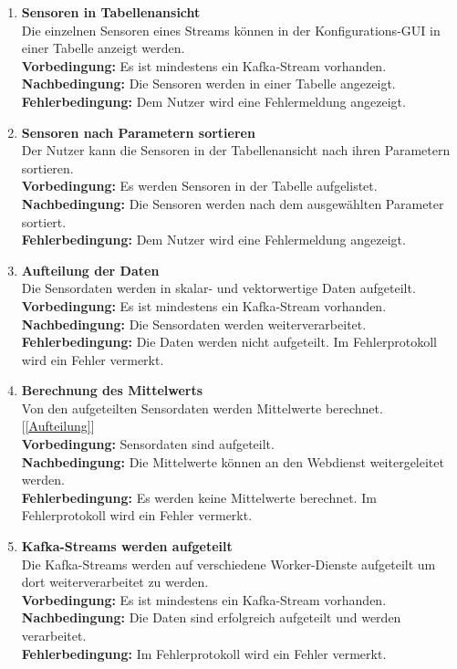\begin{enumerate}[label=\textbf{PF\arabic{enumi}0}]
	\item \textbf{Sensoren in Tabellenansicht}\\
		Die einzelnen Sensoren eines Streams können in der Konfigurations-GUI in einer Tabelle anzeigt werden.\\
		\textbf{Vorbedingung:} Es ist mindestens ein Kafka-Stream vorhanden.\\
		\textbf{Nachbedingung:} Die Sensoren werden in einer Tabelle angezeigt.\\
		\textbf{Fehlerbedingung:} Dem Nutzer wird eine Fehlermeldung angezeigt.
		
	\item \textbf{Sensoren nach Parametern sortieren}\\
		Der Nutzer kann die Sensoren in der Tabellenansicht nach ihren Parametern sortieren.\\
		\textbf{Vorbedingung:} Es werden Sensoren in der Tabelle aufgelistet.\\
		\textbf{Nachbedingung:} Die Sensoren werden nach dem ausgewählten Parameter sortiert.\\
		\textbf{Fehlerbedingung:} Dem Nutzer wird eine Fehlermeldung angezeigt.
		
	\item \textbf{Aufteilung der Daten} \label{Aufteilung}\\
		Die Sensordaten werden in skalar- und vektorwertige Daten aufgeteilt.\\
		\textbf{Vorbedingung:} Es ist mindestens ein Kafka-Stream vorhanden.\\
		\textbf{Nachbedingung:} Die Sensordaten werden weiterverarbeitet.\\
		\textbf{Fehlerbedingung:} Die Daten werden nicht aufgeteilt. Im Fehlerprotokoll wird ein Fehler vermerkt.
		
	\item \textbf{Berechnung des Mittelwerts} \label{Mittel}\\
		Von den aufgeteilten Sensordaten werden Mittelwerte berechnet. [\ref{Aufteilung}]\\
		\textbf{Vorbedingung:} Sensordaten sind aufgeteilt.\\
		\textbf{Nachbedingung:} Die Mittelwerte können an den Webdienst weitergeleitet werden.\\
		\textbf{Fehlerbedingung:} Es werden keine Mittelwerte berechnet. Im Fehlerprotokoll wird ein Fehler vermerkt.
		
	\item \textbf{Kafka-Streams werden aufgeteilt}\\
		Die Kafka-Streams werden auf verschiedene Worker-Dienste aufgeteilt um dort weiterverarbeitet zu werden.\\
		\textbf{Vorbedingung:} Es ist mindestens ein Kafka-Stream vorhanden.\\
		\textbf{Nachbedingung:} Die Daten sind erfolgreich aufgeteilt und werden verarbeitet.\\
		\textbf{Fehlerbedingung:} Im Fehlerprotokoll wird ein Fehler vermerkt.
		

\end{enumerate}
